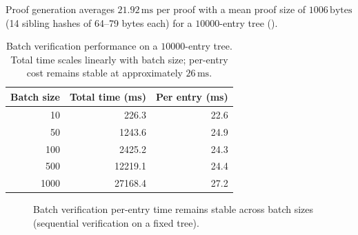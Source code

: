 \documentclass[preprint,12pt]{elsarticle}
\begin{document}
Proof generation averages $21.92\,\mathrm{ms}$ per proof with a mean proof size of $1006\,\mathrm{bytes}$ (14 sibling hashes of 64--79 bytes each) for a $10000$-entry tree ().

\begin{table}[t]
\centering
\caption{Batch verification performance on a $10000$-entry tree.  Total time scales linearly with batch size; per-entry cost remains stable at approximately $26\,\mathrm{ms}$.}
\label{tab:verification}
\small
\renewcommand{\arraystretch}{1.2}
\begin{tabular}{r
  r
  r}
\toprule
{\textbf{Batch size}} & {\textbf{Total time (ms)}} & {\textbf{Per entry (ms)}} \\
\midrule
   10 &    226.3 & 22.6 \\
   50 &   1243.6 & 24.9 \\
  100 &   2425.2 & 24.3 \\
  500 &  12219.1 & 24.4 \\
 1000 &  27168.4 & 27.2 \\
\bottomrule
\end{tabular}
\end{table}

\begin{figure}[t]
\centering
{}
\caption{Batch verification per-entry time remains stable across batch sizes (sequential verification on a fixed tree).}
\label{fig:verification_batch}
\end{figure}
\end{document}
